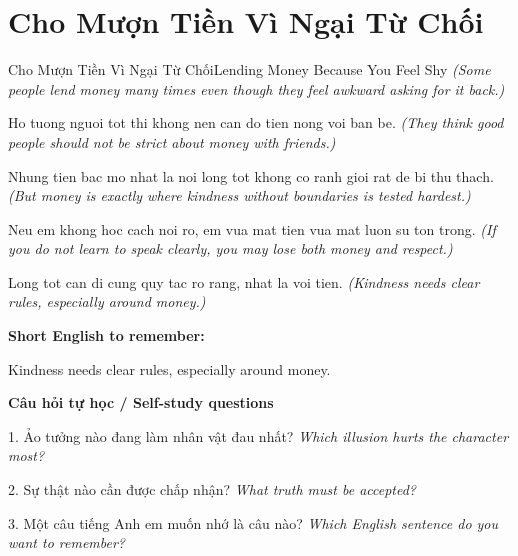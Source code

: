 \section{Cho Mượn Tiền Vì Ngại Từ Chối}
\begin{truyen}{Cho Mượn Tiền Vì Ngại Từ Chối}{Lending Money Because You Feel Shy}
\textit{(Some people lend money many times even though they feel awkward asking for it back.)}

Ho tuong nguoi tot thi khong nen can do tien nong voi ban be.
\textit{(They think good people should not be strict about money with friends.)}

Nhung tien bac mo nhat la noi long tot khong co ranh gioi rat de bi thu thach.
\textit{(But money is exactly where kindness without boundaries is tested hardest.)}

Neu em khong hoc cach noi ro, em vua mat tien vua mat luon su ton trong.
\textit{(If you do not learn to speak clearly, you may lose both money and respect.)}

\end{truyen}

\begin{baihoc}
Long tot can di cung quy tac ro rang, nhat la voi tien.
\textit{(Kindness needs clear rules, especially around money.)}
\end{baihoc}

\begin{ghinhoanh}
\textbf{Short English to remember:}

Kindness needs clear rules, especially around money.

\end{ghinhoanh}

\begin{tuhocnhanh}
\textbf{Câu hỏi tự học / Self-study questions}

1. Ảo tưởng nào đang làm nhân vật đau nhất? \textit{Which illusion hurts the character most?}

2. Sự thật nào cần được chấp nhận? \textit{What truth must be accepted?}

3. Một câu tiếng Anh em muốn nhớ là câu nào? \textit{Which English sentence do you want to remember?}
\end{tuhocnhanh}
\ngancach

